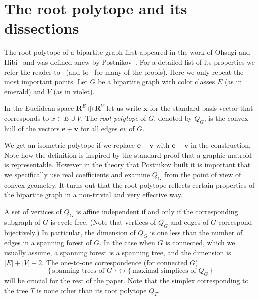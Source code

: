 \documentclass[ALCO,ThmDefs,Unicode,epreuves]{cedram}
\newcommand{\R}{\mathbf{R}}
\begin{document}
\section{The root polytope and its dissections} 
\label{sec:root_polytope}

The root polytope of a bipartite graph first appeared in the work of Ohsugi and Hibi~\cite{hibi} and was defined anew by Postnikov~\cite{alex}. For a detailed list of its properties we refer the reader to~\cite[Section~3]{KP_Ehrhart} (and to~\cite{alex} for many of the proofs). Here we only repeat the most important points. Let $G$ be a bipartite graph with color classes $E$ (as in emerald) and $V$ (as in violet). 

\begin{defi} %
\label{def:rootpolytope}
In the Euclidean space $\R^E\oplus\R^V$ let us write $\mathbf x$ for the standard basis vector that corresponds to $x\in E \cup V$. The \emph{root polytope} of $G$, denoted by $Q_G$, is the convex hull of the vectors $\mathbf e +\mathbf v$ for all edges $ev$ of $G$.
\end{defi}

We get an isometric polytope if we replace $\mathbf e +\mathbf v$ with $\mathbf e -\mathbf v$ in the construction. Note how the definition is inspired by the standard proof that a graphic matroid is representable. However in the theory that Postnikov built it is important that we specifically use real coefficients and examine $Q_G$ from the point of view of convex geometry. It turns out that the root polytope reflects certain properties of the bipartite graph in a non-trivial and very effective way.
 
A set of vertices of $Q_G$ is affine independent if and only if the corresponding subgraph of $G$ is cycle-free. (Note that vertices of $Q_G$ and edges of $G$ correspond bijectively.) In particular, the dimension of $Q_G$ is one less than the number of edges in a spanning forest of $G$. In the case when $G$ is connected, which we usually assume, a spanning forest is a spanning tree, and the dimension is $|E|+|V|-2$. The one-to-one correspondence (for connected $G$)
\[\{\,\text{spanning trees of }G\,\}\longleftrightarrow\{\,\text{maximal simplices of }Q_G\,\}\]
will be crucial for the rest of the paper. Note that the simplex corresponding to the tree $T$ is none other than its root polytope $Q_T$.
\end{document}
